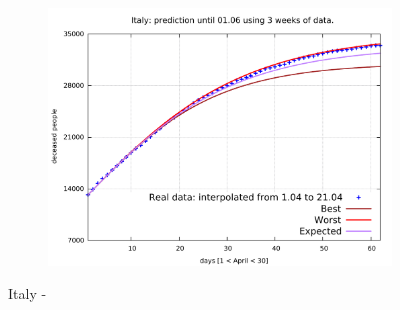 \documentclass[8pt]{article}
\begin{document}
\begin{figure}[h!]
\begin{subfigure}[b]{0.45\linewidth}
  \includegraphics[width=\linewidth]{../err100p_simulations/it/1-21/1-21.pdf}
  \end{subfigure}
	\caption{Italy - }
\end{figure}
\end{document}
